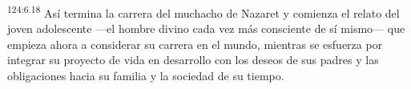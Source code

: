 \par
\textsuperscript{124:6.18} Así termina la carrera del muchacho de Nazaret y comienza el relato del joven adolescente ---el hombre divino cada vez más consciente de sí mismo--- que empieza ahora a considerar su carrera en el mundo, mientras se esfuerza por integrar su proyecto de vida en desarrollo con los deseos de sus padres y las obligaciones hacia su familia y la sociedad de su tiempo.